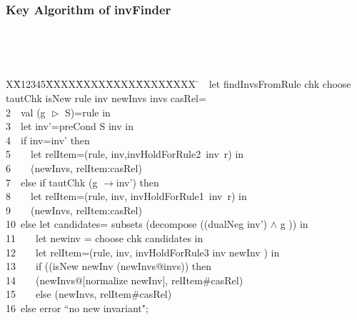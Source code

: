 \documentclass{beamer}
\newlength{\fminilength}
\newenvironment{fmini}[1][\linewidth]
  {\setlength{\fminilength}{#1\fboxsep-2\fboxrule}%
   \vspace{2ex}\noindent\begin{lrbox}{\fminibox}\begin{minipage}{\fminilength}%
   \mbox{ }\hfill\vspace{-2.5ex}}%
  {\end{minipage}\end{lrbox}\vspace{1ex}\hspace{0ex}%
   \framebox{\usebox{\fminibox}}}
\newenvironment{specification}
{\noindent\scriptsize
\tt\begin{fmini}\begin{tabbing}X\=X12345\=XXXX\=XXXX\=XXXX\=XXXX\=XXXX
\=\+\kill} {\end{tabbing}\normalfont\end{fmini}}
\def \twoSpaces {\ \ }
\def \oneSpace {\ }
\def \oneSpace {\ }
\def \andc {\wedge }
\begin{document}
\begin{frame}\frametitle{Key Algorithm of {\sf invFinder}}
\begin{specification}
1\twoSpaces let findInvsFromRule  chk choose  tautChk isNew rule inv newInvs invs casRel=\\
2\twoSpaces   val (g $\vartriangleright$ S)=rule in\\

3\twoSpaces   let inv'=preCond S inv in\\


4\twoSpaces   if  inv=inv' then\\

5\twoSpaces  \twoSpaces       let relItem=(rule,
inv,invHoldForRule2~inv~r) in\\
6\twoSpaces  \twoSpaces         (newInvs, relItem:casRel)\\


7\twoSpaces   else if  tautChk (g $\longrightarrow$inv') then\\
8\twoSpaces  \twoSpaces     let relItem=(rule, inv, invHoldForRule1~inv~r) in \\
9\twoSpaces  \twoSpaces        (newInvs, relItem:casRel)   \\


10\oneSpace   else let  candidates= subsets (decompose ((dualNeg inv') $\andc$ g ))  in\\

11\twoSpaces  \twoSpaces  let newinv =  choose chk candidates in\\


12\twoSpaces  \twoSpaces     let relItem=(rule, inv,  invHoldForRule3 inv newInv   ) in\\

13\twoSpaces  \twoSpaces   if   ((isNew newInv (newInvs@invs)) then\\
14\twoSpaces  \twoSpaces   (newInvs@[normalize newInv], relItem\#casRel)\\
15\twoSpaces  \twoSpaces   else (newInvs,  relItem\#casRel)\\


16\oneSpace  else  error ``no new invariant";\\
\end{specification}
 \end{frame}
\end{document}
